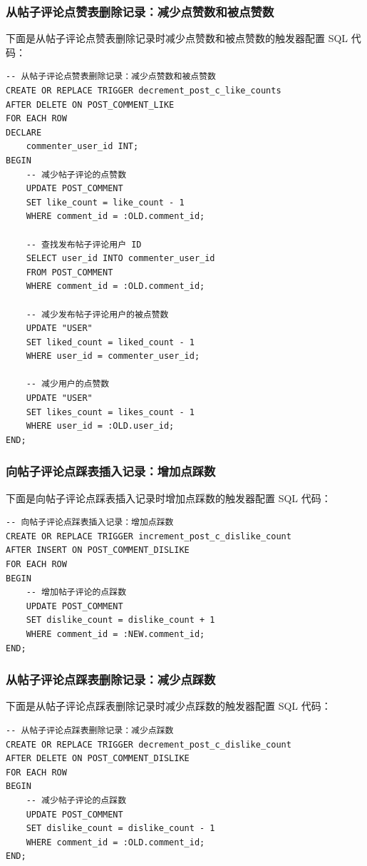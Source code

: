 \subsubsection{从帖子评论点赞表删除记录：减少点赞数和被点赞数}

下面是从帖子评论点赞表删除记录时减少点赞数和被点赞数的触发器配置 SQL 代码：

\begin{verbatim}
-- 从帖子评论点赞表删除记录：减少点赞数和被点赞数
CREATE OR REPLACE TRIGGER decrement_post_c_like_counts
AFTER DELETE ON POST_COMMENT_LIKE
FOR EACH ROW
DECLARE
    commenter_user_id INT;
BEGIN
    -- 减少帖子评论的点赞数
    UPDATE POST_COMMENT
    SET like_count = like_count - 1
    WHERE comment_id = :OLD.comment_id;

    -- 查找发布帖子评论用户 ID
    SELECT user_id INTO commenter_user_id
    FROM POST_COMMENT
    WHERE comment_id = :OLD.comment_id;

    -- 减少发布帖子评论用户的被点赞数
    UPDATE "USER"
    SET liked_count = liked_count - 1
    WHERE user_id = commenter_user_id;

    -- 减少用户的点赞数
    UPDATE "USER"
    SET likes_count = likes_count - 1
    WHERE user_id = :OLD.user_id;
END;
\end{verbatim}

\subsubsection{向帖子评论点踩表插入记录：增加点踩数}

下面是向帖子评论点踩表插入记录时增加点踩数的触发器配置 SQL 代码：

\begin{verbatim}
-- 向帖子评论点踩表插入记录：增加点踩数
CREATE OR REPLACE TRIGGER increment_post_c_dislike_count
AFTER INSERT ON POST_COMMENT_DISLIKE
FOR EACH ROW
BEGIN
    -- 增加帖子评论的点踩数
    UPDATE POST_COMMENT
    SET dislike_count = dislike_count + 1
    WHERE comment_id = :NEW.comment_id;
END;
\end{verbatim}

\subsubsection{从帖子评论点踩表删除记录：减少点踩数}

下面是从帖子评论点踩表删除记录时减少点踩数的触发器配置 SQL 代码：

\begin{verbatim}
-- 从帖子评论点踩表删除记录：减少点踩数
CREATE OR REPLACE TRIGGER decrement_post_c_dislike_count
AFTER DELETE ON POST_COMMENT_DISLIKE
FOR EACH ROW
BEGIN
    -- 减少帖子评论的点踩数
    UPDATE POST_COMMENT
    SET dislike_count = dislike_count - 1
    WHERE comment_id = :OLD.comment_id;
END;
\end{verbatim}

